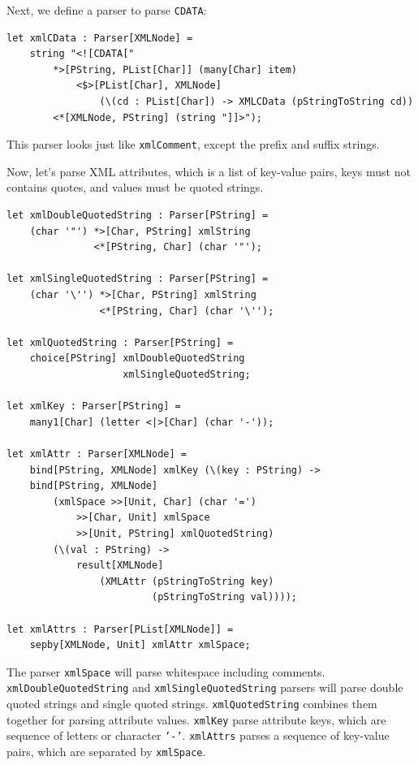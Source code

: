 Next, we define a parser to parse \texttt{CDATA}:

\begin{lstlisting}
let xmlCData : Parser[XMLNode] =
    string "<![CDATA["
        *>[PString, PList[Char]] (many[Char] item)
            <$>[PList[Char], XMLNode]
                (\(cd : PList[Char]) -> XMLCData (pStringToString cd))
        <*[XMLNode, PString] (string "]]>");
\end{lstlisting}

This parser looks just like \texttt{xmlComment}, except the prefix and suffix strings.

Now, let's parse XML attributes, which is a list of key-value pairs, keys must not contains quotes, and values must be quoted strings.

\begin{lstlisting}
let xmlDoubleQuotedString : Parser[PString] =
    (char '"') *>[Char, PString] xmlString
               <*[PString, Char] (char '"');

let xmlSingleQuotedString : Parser[PString] =
    (char '\'') *>[Char, PString] xmlString
                <*[PString, Char] (char '\'');

let xmlQuotedString : Parser[PString] =
    choice[PString] xmlDoubleQuotedString
                    xmlSingleQuotedString;

let xmlKey : Parser[PString] =
    many1[Char] (letter <|>[Char] (char '-'));

let xmlAttr : Parser[XMLNode] =
    bind[PString, XMLNode] xmlKey (\(key : PString) ->
    bind[PString, XMLNode]
        (xmlSpace >>[Unit, Char] (char '=')
            >>[Char, Unit] xmlSpace
            >>[Unit, PString] xmlQuotedString)
        (\(val : PString) ->
            result[XMLNode]
                (XMLAttr (pStringToString key)
                         (pStringToString val))));

let xmlAttrs : Parser[PList[XMLNode]] =
    sepby[XMLNode, Unit] xmlAttr xmlSpace;
\end{lstlisting}

The parser \texttt{xmlSpace} will parse whitespace including comments. \texttt{xmlDoubleQuotedString} and \texttt{xmlSingleQuotedString} parsers will parse double quoted strings and single quoted strings. \texttt{xmlQuotedString} combines them together for parsing attribute values. \texttt{xmlKey} parse attribute keys, which are sequence of letters or character \texttt{'-'}. \texttt{xmlAttrs} parses a sequence of key-value pairs, which are separated by \texttt{xmlSpace}.

